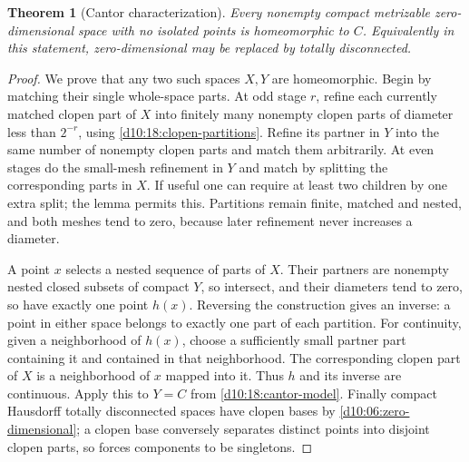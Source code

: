 \documentclass[11pt,oneside,openany]{book}
\newtheorem{theorem}{Theorem}[chapter]
\theoremstyle{definition}
\theoremstyle{remark}
\begin{document}
\begin{theorem}[Cantor characterization]\label{d10:18:cantor-characterization}
Every nonempty compact metrizable zero-dimensional space with no
isolated points is homeomorphic to $C$.
Equivalently in this statement, zero-dimensional may be replaced by
totally disconnected.
\end{theorem}
\begin{proof}
We prove that any two such spaces $X,Y$ are homeomorphic. Begin by
matching their single whole-space parts. At odd stage $r$, refine
each currently matched clopen part of $X$ into finitely many nonempty
clopen parts of diameter less than $2^{-r}$, using
\cref{d10:18:clopen-partitions}. Refine its partner in $Y$ into the
same number of nonempty clopen parts and match them arbitrarily.
At even stages do the small-mesh refinement in $Y$ and match by
splitting the corresponding parts in $X$. If useful one can require
at least two children by one extra split; the lemma permits this.
Partitions remain finite, matched and nested, and both meshes tend
to zero, because later refinement never increases a diameter.

A point $x$ selects a nested sequence of parts of $X$. Their partners
are nonempty nested closed subsets of compact $Y$, so intersect,
and their diameters tend to zero, so have exactly one point $h(x)$.
Reversing the construction gives an inverse: a point in either
space belongs to exactly one part of each partition.
For continuity, given a neighborhood of $h(x)$, choose a sufficiently
small partner part containing it and contained in that neighborhood.
The corresponding clopen part of $X$ is a neighborhood of $x$
mapped into it. Thus $h$ and its inverse are continuous.
Apply this to $Y=C$ from \cref{d10:18:cantor-model}.
Finally compact Hausdorff totally disconnected spaces have clopen
bases by \cref{d10:06:zero-dimensional}; a clopen base conversely
separates distinct points into disjoint clopen parts, so forces
components to be singletons.
\end{proof}
\end{document}
